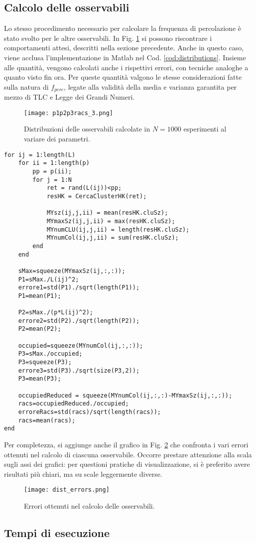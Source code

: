 \subsection*{Calcolo delle osservabili}
Lo stesso procedimento necessario per calcolare la frequenza di percolazione è stato svolto per 
le altre osservabili. In Fig. \ref{fig:distributions} si possono riscontrare i comportamenti 
attesi, descritti nella sezione precedente.
Anche in questo caso, viene acclusa l'implementazione in Matlab nel Cod. \ref{cod:distributions}.
Insieme alle quantità, vengono calcolati anche i rispettivi errori, con tecniche analoghe a quanto visto 
fin ora. Per queste quantità valgono le stesse considerazioni fatte sulla natura di $f_{perc}$,
legate alla validità della media e varianza garantita per mezzo di 
TLC e Legge dei Grandi Numeri.
\begin{figure}[ht]
    \texttt{[image: p1p2p3racs\_3.png]}
    \caption{Distribuzioni delle osservabili calcolate in $N=1000$ esperimenti al variare dei parametri.}
    \label{fig:distributions}
\end{figure}
\begin{lstlisting}[caption={Porzione di codice per il calcolo delle osservabili.},label={cod:distributions}]
for ij = 1:length(L)
    for ii = 1:length(p)
        pp = p(ii);
        for j = 1:N
            ret = rand(L(ij))<pp;
            resHK = CercaClusterHK(ret);

            MYsz(ij,j,ii) = mean(resHK.cluSz);
            MYmaxSz(ij,j,ii) = max(resHK.cluSz);
            MYnumCLU(ij,j,ii) = length(resHK.cluSz);
            MYnumCol(ij,j,ii) = sum(resHK.cluSz);
        end
    end
   
    sMax=squeeze(MYmaxSz(ij,:,:));
    P1=sMax./L(ij)^2;
    errore1=std(P1)./sqrt(length(P1));
    P1=mean(P1);

    P2=sMax./(p*L(ij)^2);
    errore2=std(P2)./sqrt(length(P2));
    P2=mean(P2);

    occupied=squeeze(MYnumCol(ij,:,:));
    P3=sMax./occupied;
    P3=squeeze(P3);
    errore3=std(P3)./sqrt(size(P3,2));
    P3=mean(P3);

    occupiedReduced = squeeze(MYnumCol(ij,:,:)-MYmaxSz(ij,:,:));
    racs=occupiedReduced./occupied;
    erroreRacs=std(racs)/sqrt(length(racs));
    racs=mean(racs);
end
\end{lstlisting}

Per completezza, si aggiunge anche il grafico in Fig. \ref{fig:dist_errors} che confronta i vari errori 
ottenuti nel calcolo di ciascuna osservabile. Occorre prestare attenzione alla scala
sugli assi dei grafici: per questioni pratiche di visualizzazione, si è preferito
avere risultati più chiari, ma su scale leggermente diverse.
\begin{figure}[ht]
    \texttt{[image: dist\_errors.png]}
    \caption{Errori ottenuti nel calcolo delle osservabili.}
    \label{fig:dist_errors}
\end{figure}

\subsection*{Tempi di esecuzione}